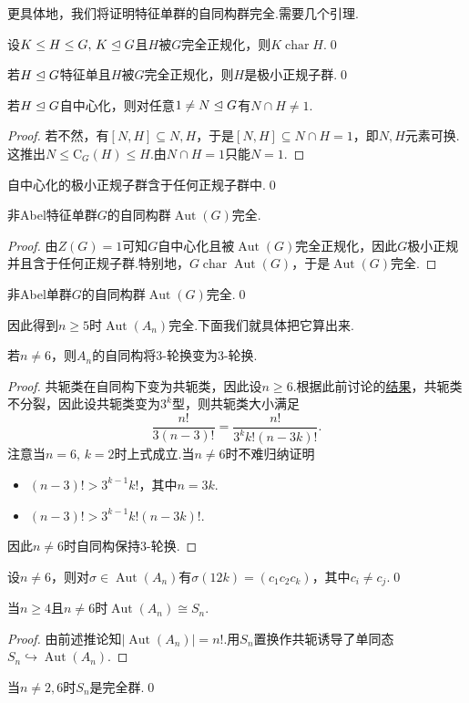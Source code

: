 更具体地，我们将证明特征单群的自同构群完全.需要几个引理.
\begin{lemma}
	设$K\le H\le G,\,K\trianglelefteq G$且$H$被$G$完全正规化，则$K\operatorname*{char}H$.\qed
\end{lemma}
\begin{cor}
	若$H\trianglelefteq G$特征单且$H$被$G$完全正规化，则$H$是极小正规子群.\qed
\end{cor}
\begin{lemma}
	若$H\trianglelefteq G$自中心化，则对任意$1\ne N\trianglelefteq G$有$N\cap H\ne 1$.
\end{lemma}
\begin{proof}
	若不然，有$[N,H]\subseteq N,H$，于是$[N,H]\subseteq N\cap H=1$，即$N,H$元素可换.这推出$N\le\mathrm{C}_G(H)\le H$.由$N\cap H=1$只能$N=1$.
\end{proof}
\begin{cor}
	自中心化的极小正规子群含于任何正规子群中.\qed
\end{cor}
\begin{thm}
	非Abel特征单群$G$的自同构群$\operatorname*{Aut}(G)$完全.
\end{thm}
\begin{proof}
	由$Z(G)=1$可知$G$自中心化且被$\operatorname*{Aut}(G)$完全正规化，因此$G$极小正规并且含于任何正规子群.特别地，$G\operatorname*{char}\operatorname*{Aut}(G)$，于是$\operatorname*{Aut}(G)$完全.
\end{proof}
\begin{cor*}
	非Abel单群$G$的自同构群$\operatorname*{Aut}(G)$完全.\qed
\end{cor*}

因此得到$n\ge 5$时$\operatorname*{Aut}(A_n)$完全.下面我们就具体把它算出来.
\begin{lemma}
	若$n\ne 6$，则$A_n$的自同构将$3$-轮换变为$3$-轮换.
\end{lemma}
\begin{proof}
	共轭类在自同构下变为共轭类，因此设$n\ge 6$.根据此前讨论的\hyperlink{prop:ConjugationClassInAlternating}{结果}，共轭类不分裂，因此设共轭类变为$3^k$型，则共轭类大小满足
	\[
		\frac{n!}{3(n-3)!}=\frac{n!}{3^kk!(n-3k)!}.
	\]
	注意当$n=6,\,k=2$时上式成立.当$n\ne 6$时不难归纳证明
	\begin{itemize}
		\item $(n-3)!>3^{k-1}k!$，其中$n=3k$.
		\item $(n-3)!>3^{k-1}k!(n-3k)!$.
	\end{itemize}
	因此$n\ne 6$时自同构保持$3$-轮换.
\end{proof}
\begin{cor}
	设$n\ne 6$，则对$\sigma\in\operatorname*{Aut}(A_n)$有$\sigma(12k)=(c_1c_2c_k)$，其中$c_i\ne c_j$.\qed
\end{cor}
\begin{prop}
	当$n\ge 4$且$n\ne 6$时$\operatorname*{Aut}(A_n)\cong S_n$.
\end{prop}
\begin{proof}
	由前述推论知$|\operatorname*{Aut}(A_n)|=n!$.用$S_n$置换作共轭诱导了单同态$S_n\hookrightarrow\operatorname*{Aut}(A_n)$.
\end{proof}
\begin{cor*}
	当$n\ne 2,6$时$S_n$是完全群.\qed
\end{cor*}

